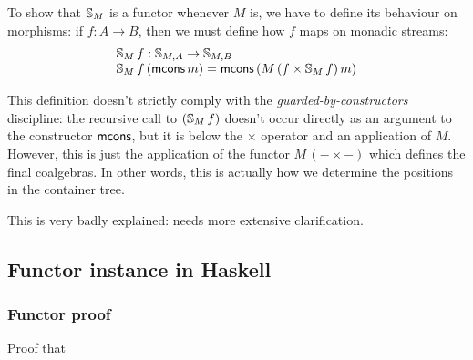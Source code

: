 \documentclass{article}
\begin{document}
To show that $\mathbb{S}_{M}$ is a functor whenever $M$ is, we have to define its behaviour on morphisms: if $f:A\rightarrow B$, then we must define how $f$ maps on monadic streams:
$$
\begin{array}{l}
\mathbb{S}_{M}\,f : \mathbb{S}_{M,A} \rightarrow \mathbb{S}_{M,B}\\
\mathbb{S}_{M}\,f\,(\mathsf{mcons}\,m) = \mathsf{mcons}\,(M\,(f\times \mathbb{S}_{M}\,f)\,m)
\end{array}
$$

This definition doesn't strictly comply with the {\em guarded-by-constructors} discipline: the recursive call to $(\mathbb{S}_{M}\,f)$ doesn't occur directly as an argument to the constructor $\mathsf{mcons}$, but it is below the $\times$ operator and an application of $M$.
However, this is just the application of the functor $M\,(- \times -)$ which defines the final coalgebras. In other words, this is actually how we determine the positions in the container tree.
\begin{vcomment}
	This is very badly explained: needs more extensive clarification.
\end{vcomment}
















\subsection{Functor instance in Haskell}


\subsubsection{Functor proof}

Proof that 
\end{document}

